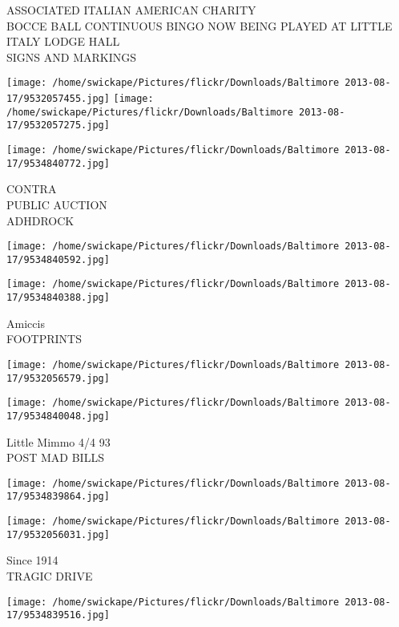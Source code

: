 \documentclass[10pt,letterpaper]{article}
\begin{document}
ASSOCIATED ITALIAN AMERICAN CHARITY\\
BOCCE BALL CONTINUOUS BINGO NOW BEING PLAYED AT LITTLE ITALY LODGE HALL\\
SIGNS AND MARKINGS\\
\pagebreak

\texttt{[image: /home/swickape/Pictures/flickr/Downloads/Baltimore 2013-08-17/9532057455.jpg]}
\texttt{[image: /home/swickape/Pictures/flickr/Downloads/Baltimore 2013-08-17/9532057275.jpg]}

\texttt{[image: /home/swickape/Pictures/flickr/Downloads/Baltimore 2013-08-17/9534840772.jpg]}

CONTRA\\
PUBLIC AUCTION\\
ADHDROCK\\
\pagebreak

\texttt{[image: /home/swickape/Pictures/flickr/Downloads/Baltimore 2013-08-17/9534840592.jpg]}

\vspace{0.25in}
\texttt{[image: /home/swickape/Pictures/flickr/Downloads/Baltimore 2013-08-17/9534840388.jpg]}

Amiccis\\
FOOTPRINTS\\
\pagebreak

\texttt{[image: /home/swickape/Pictures/flickr/Downloads/Baltimore 2013-08-17/9532056579.jpg]}

\vspace{0.25in}
\texttt{[image: /home/swickape/Pictures/flickr/Downloads/Baltimore 2013-08-17/9534840048.jpg]}

Little Mimmo 4/4 93\\
POST MAD BILLS\\
\pagebreak

\texttt{[image: /home/swickape/Pictures/flickr/Downloads/Baltimore 2013-08-17/9534839864.jpg]}

\vspace{0.25in}
\texttt{[image: /home/swickape/Pictures/flickr/Downloads/Baltimore 2013-08-17/9532056031.jpg]}

Since 1914\\
TRAGIC DRIVE\\
\pagebreak

\texttt{[image: /home/swickape/Pictures/flickr/Downloads/Baltimore 2013-08-17/9534839516.jpg]}
\end{document}
